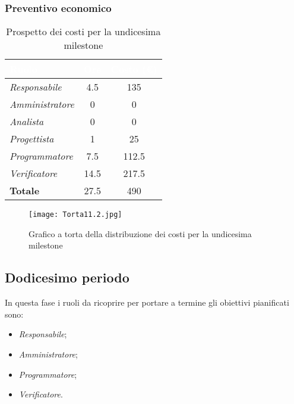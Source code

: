 \newpage
\subsubsection{Preventivo economico}

\begin{table}[H]
    \renewcommand\arraystretch{1.5}
    \centering
    \begin{tabular}{|l|c|c|}
    \hline
    \rowcolor[HTML]{036400}
    \textcolor{white}{\textbf{Ruolo}} & \multicolumn{1}{l|}{\textcolor{white}{\textbf{Ore}}} & \multicolumn{1}{l|}{\textcolor{white}{\textbf{Costo (€)}}} \\ \hline
    \rowcolor[HTML]{EFEFEF}\textit{Responsabile}   & 4.5    & 135    \\ \hline
    \rowcolor[HTML]{C0C0C0}\textit{Amministratore} & 0  & 0     \\ \hline
    \rowcolor[HTML]{EFEFEF}\textit{Analista}       & 0    & 0      \\ \hline
    \rowcolor[HTML]{C0C0C0}\textit{Progettista}    & 1    & 25     \\ \hline
    \rowcolor[HTML]{EFEFEF}\textit{Programmatore}  & 7.5   & 112.5    \\ \hline
    \rowcolor[HTML]{C0C0C0}\textit{Verificatore}   & 14.5   & 217.5    \\ \hline
    \rowcolor[HTML]{EFEFEF}\textbf{Totale}         & 27.5 & 490   \\ \hline
    \end{tabular}
    \caption{Prospetto dei costi per la undicesima milestone}
\end{table}

\begin{figure}[H]
    \texttt{[image: Torta11.2.jpg]}
    \caption{Grafico a torta della distribuzione dei costi per la undicesima milestone}
\end{figure}

\subsection{Dodicesimo periodo}

In questa fase i ruoli da ricoprire per portare a termine gli obiettivi pianificati sono:
\begin{itemize}
    \item \textit{Responsabile};
    \item \textit{Amministratore};
    \item \textit{Programmatore};
    \item \textit{Verificatore}.
\end{itemize}

